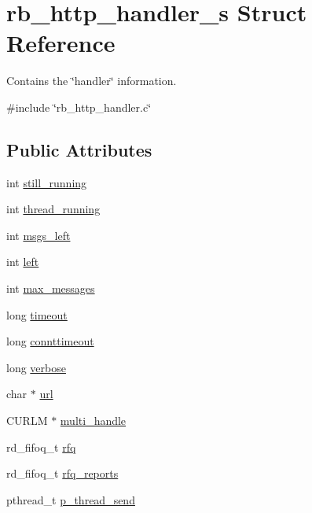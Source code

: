 \hypertarget{structrb__http__handler__s}{\section{rb\-\_\-http\-\_\-handler\-\_\-s Struct Reference}
\label{structrb__http__handler__s}
}


Contains the \char`\"{}handler\char`\"{} information.  




{\ttfamily \#include \char`\"{}rb\-\_\-http\-\_\-handler.\-c\char`\"{}}

\subsection*{Public Attributes}
\begin{DoxyCompactItemize}
\item 
int \hyperlink{structrb__http__handler__s_aa49e97bedda03106912088dad0b75e64}{still\-\_\-running}
\item 
int \hyperlink{structrb__http__handler__s_a978656c7c89a80d411121107c97a0dcd}{thread\-\_\-running}
\item 
int \hyperlink{structrb__http__handler__s_a803db851c00a617f8a80f00f29d9dba3}{msgs\-\_\-left}
\item 
int \hyperlink{structrb__http__handler__s_a6239490836609d286669af640028ae71}{left}
\item 
int \hyperlink{structrb__http__handler__s_ac8ff888740fc0f4c4365fa08fc7d044f}{max\-\_\-messages}
\item 
long \hyperlink{structrb__http__handler__s_a619a5777839d378f50240c703558b4a8}{timeout}
\item 
long \hyperlink{structrb__http__handler__s_ae4538da6abfe51878cf87aa990105c59}{connttimeout}
\item 
long \hyperlink{structrb__http__handler__s_a0bca537c3590135753bdd217559bb422}{verbose}
\item 
char $\ast$ \hyperlink{structrb__http__handler__s_a1f0df317f6eca7893bb08a54f13870ef}{url}
\item 
C\-U\-R\-L\-M $\ast$ \hyperlink{structrb__http__handler__s_a45c0ce1f2e4d154d0194bb60569c0faf}{multi\-\_\-handle}
\item 
rd\-\_\-fifoq\-\_\-t \hyperlink{structrb__http__handler__s_a39160211aefb64ec052138229da98632}{rfq}
\item 
rd\-\_\-fifoq\-\_\-t \hyperlink{structrb__http__handler__s_a383f2047cfcdd9fe49d0deacf770a73c}{rfq\-\_\-reports}
\item 
pthread\-\_\-t \hyperlink{structrb__http__handler__s_ae969c34a0421fe32951cb31802735f13}{p\-\_\-thread\-\_\-send}
\end{DoxyCompactItemize}



